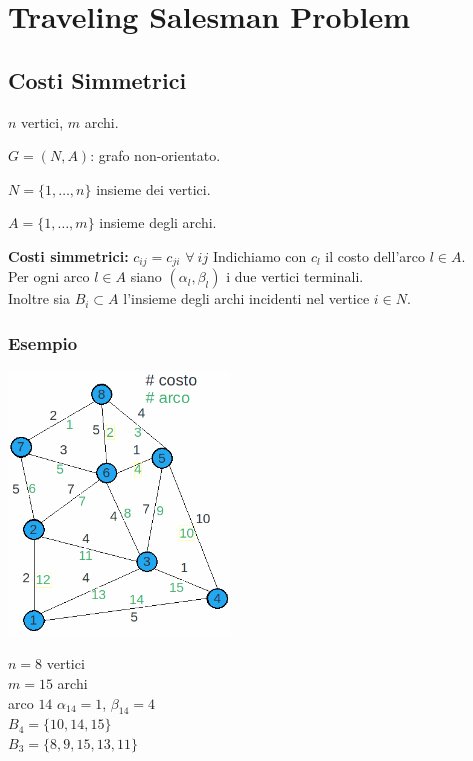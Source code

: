 \section{Traveling Salesman Problem}
\subsection{Costi Simmetrici}
$n$ vertici, $m$ archi.

$G=(N,A)$: grafo non-orientato.

$N=\{1,\dots,n\}$ insieme dei vertici.

$A=\{1,\dots,m\}$ insieme degli archi.

\textbf{Costi simmetrici:} $c_{ij}=c_{ji}$ $\forall\ ij$
Indichiamo con $c_{l}$ il costo dell'arco $l\in A$.\\
Per ogni arco $l\in A$ siano $(\alpha_{l},\beta_{l})$ i due vertici terminali.\\
Inoltre sia $B_{i}\subset A$ l'insieme degli archi incidenti nel vertice $i\in N$.
\subsubsection{Esempio}
\begin{minipage}[l]{0.5\textwidth}
	\includegraphics[height=7cm]{images/graph30.png}
\end{minipage}
\begin{minipage}[r]{0.5\textwidth}
	$n=8$ vertici\\
	$m=15$ archi\\
	arco $14$ $\alpha_{14}=1$, $\beta_{14}=4$\\
	$B_{4}=\{10,14,15\}$\\
	$B_{3}=\{8,9,15,13,11\}$
\end{minipage}
